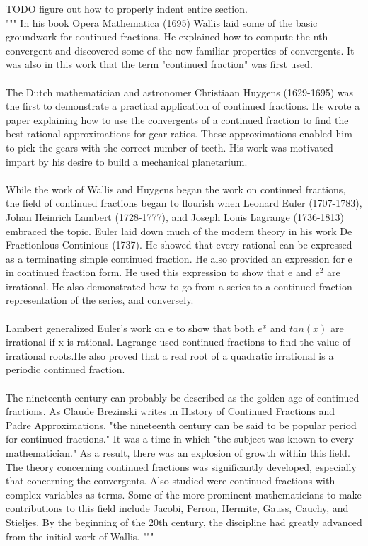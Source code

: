 \documentclass[a4paper]{article}
\begin{document}
TODO figure out how to properly indent entire section.
\\
"""
In his book Opera Mathematica (1695) Wallis laid some of the basic groundwork for continued fractions. He explained how to compute the nth convergent and discovered some of the now familiar properties of convergents. It was also in this work that the term "continued fraction" was first used.
\\
\\
The Dutch mathematician and astronomer Christiaan Huygens (1629-1695) was the first to demonstrate a practical application of continued fractions. He wrote a paper explaining how to use the convergents of a continued fraction to find the best rational approximations for gear ratios. These approximations enabled him to pick the gears with the correct number of teeth. His work was motivated impart by his desire to build a mechanical planetarium.
\\
\\
While the work of Wallis and Huygens began the work on continued fractions, the field of continued fractions began to flourish when Leonard Euler (1707-1783), Johan Heinrich Lambert (1728-1777), and Joseph Louis Lagrange (1736-1813) embraced the topic. Euler laid down much of the modern theory in his work De Fractionlous Continious (1737). He showed that every rational can be expressed as a terminating simple continued fraction. He also provided an expression for e in continued fraction form. He used this expression to show that e and $e^2$ are irrational. He also demonstrated how to go from a series to a continued fraction representation of the series, and conversely.
\\
\\
Lambert generalized Euler's work on e to show that both $e^x$ and $tan(x)$ are irrational if x is rational. Lagrange used continued fractions to find the value of irrational roots.He also proved that a real root of a quadratic irrational is a periodic continued fraction.
\\
\\
The nineteenth century can probably be described as the golden age of continued fractions. As Claude Brezinski writes in History of Continued Fractions and Padre Approximations, "the nineteenth century can be said to be popular period for continued fractions." It was a time in which "the subject was known to every mathematician." As a result, there was an explosion of growth within this field. The theory concerning continued fractions was significantly developed, especially that concerning the convergents. Also studied were continued fractions with complex variables as terms. Some of the more prominent mathematicians to make contributions to this field include Jacobi, Perron, Hermite, Gauss, Cauchy, and Stieljes. By the beginning of the 20th century, the discipline had greatly advanced from the initial work of Wallis.
"""
\end{document}
